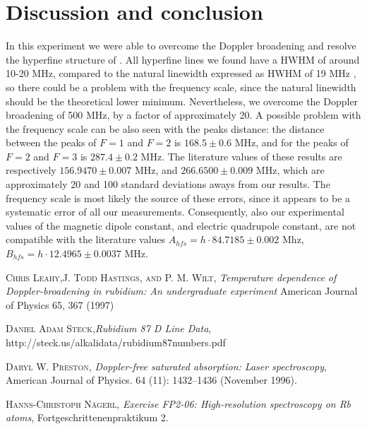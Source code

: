 \documentclass[a4paper,10pt]{article}
\begin{document}
\section{Discussion and conclusion}
In this experiment we were able to overcome the Doppler broadening and resolve the hyperfine structure of . All hyperfine lines we found have a HWHM of around 10-20 MHz, compared to the natural linewidth expressed as HWHM of 19 MHz \cite{rubidium87data}, so there could be a problem with the frequency scale, since the natural linewidth should be the theoretical lower minimum. Nevertheless, we overcome the Doppler broadening of 500 MHz, by a factor of approximately 20. A possible problem with the frequency scale can be also seen with the peaks distance: the distance between the peaks of $F=1$ and $F=2$ is $168.5\pm0.6$ MHz, and for the peaks of $F=2$ and $F=3$ is $287.4\pm 0.2$ MHz. The literature values of these results are respectively \cite{rubidium87data} $156.9470\pm 0.007$ MHz, and $266.6500\pm0.009$ MHz, which are approximately 20 and 100 standard deviations aways from our results. The frequency scale is most likely the source of these errors, since it appears to be a systematic error of all our measurements. Consequently, also our experimental values of the magnetic dipole constant, and electric quadrupole constant, are not compatible with the literature values \cite{rubidium87data} $A_{hfs} = h\cdot84.7185\pm0.002$ Mhz, $B_{hfs} = h\cdot 12.4965\pm 0.0037$ MHz.

\begin{thebibliography}{99}
\textsc{Chris Leahy,J. Todd Hastings, and P. M. Wilt}, \textit{Temperature dependence of Doppler-broadening in rubidium: An undergraduate experiment} American Journal of Physics 65, 367 (1997)

 \textsc{Daniel Adam Steck},\textit{Rubidium 87 D Line Data}, http://steck.us/alkalidata/rubidium87numbers.pdf
 
\textsc{Daryl W. Preston}, \textit{Doppler-free saturated absorption: Laser spectroscopy}, American Journal of Physics. 64 (11): 1432–1436 (November 1996).

\textsc{Hanns-Christoph N{\"a}gerl}, \textit{Exercise FP2-06: High-resolution spectroscopy on Rb atoms}, Fortgeschrittenenpraktikum 2.
\end{thebibliography}
\end{document}
